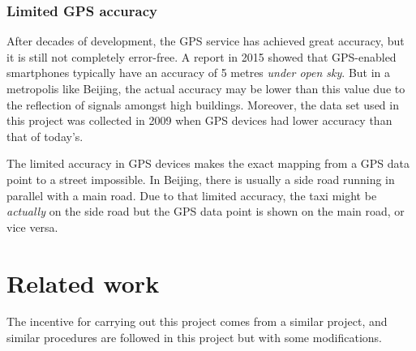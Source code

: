 \subsubsection{Limited GPS accuracy}
After decades of development, the GPS service has achieved great accuracy, but it is still not completely error-free. A report\cite{FP15} in 2015 showed that GPS-enabled smartphones typically have an accuracy of 5 metres \emph{under open sky}. But in a metropolis like Beijing, the actual accuracy may be lower than this value due to the reflection of signals amongst high buildings. Moreover, the data set used in this project was collected in 2009 when GPS devices had lower accuracy than that of today's.

The limited accuracy in GPS devices makes the exact mapping from a GPS data point to a street impossible. In Beijing, there is usually a side road running in parallel with a main road. Due to that limited accuracy, the taxi might be \emph{actually} on the side road but the GPS data point is shown on the main road, or vice versa. 

\section{Related work}
The incentive for carrying out this project comes from a similar project\cite{TDR10}, and similar procedures are followed in this project but with some modifications. 


